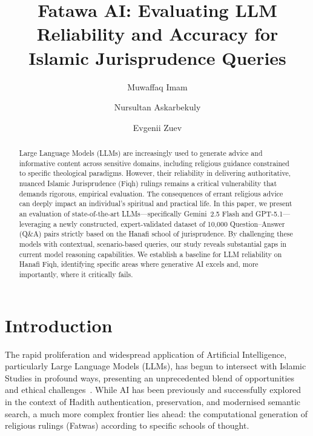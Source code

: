 \documentclass[runningheads]{llncs}
\begin{document}
\title{Fatawa AI: Evaluating LLM Reliability and Accuracy for Islamic Jurisprudence Queries}

\author{Muwaffaq Imam \and
Nursultan Askarbekuly \and
Evgenii Zuev}


\maketitle

\begin{abstract}
Large Language Models (LLMs) are increasingly used to generate advice and informative content across sensitive domains, including religious guidance constrained to specific theological paradigms. However, their reliability in delivering authoritative, nuanced Islamic Jurisprudence (Fiqh) rulings remains a critical vulnerability that demands rigorous, empirical evaluation. The consequences of errant religious advice can deeply impact an individual's spiritual and practical life. In this paper, we present an evaluation of state-of-the-art LLMs---specifically Gemini~2.5 Flash and GPT-5.1---leveraging a newly constructed, expert-validated dataset of 10{,}000 Question--Answer (Q\&A) pairs strictly based on the Hanafi school of jurisprudence. By challenging these models with contextual, scenario-based queries, our study reveals substantial gaps in current model reasoning capabilities. We establish a baseline for LLM reliability on Hanafi Fiqh, identifying specific areas where generative AI excels and, more importantly, where it critically fails.

\end{abstract}

\section{Introduction}

The rapid proliferation and widespread application of Artificial Intelligence, particularly Large Language Models (LLMs), has begun to intersect with Islamic Studies in profound ways, presenting an unprecedented blend of opportunities and ethical challenges~\cite{islamicEval2025}. While AI has been previously and successfully explored in the context of Hadith authentication, preservation, and modernised semantic search, a much more complex frontier lies ahead: the computational generation of religious rulings (Fatwas) according to specific schools of thought.
\end{document}
